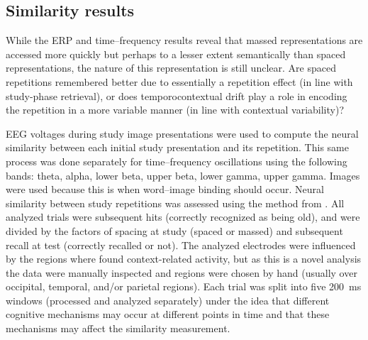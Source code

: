 
\subsection{Similarity results}

While the ERP and time--frequency results reveal that massed representations are accessed more quickly but perhaps to a lesser extent semantically than spaced representations, the nature of this representation is still unclear.  Are spaced repetitions remembered better due to essentially a repetition effect (in line with study-phase retrieval), or does temporocontextual drift play a role in encoding the repetition in a more variable manner (in line with contextual variability)?

EEG voltages during study image presentations were used to compute the neural similarity between each initial study presentation and its repetition.  This same process was done separately for time--frequency oscillations using the following bands: theta, alpha, lower beta, upper beta, lower gamma, upper gamma.  Images were used because this is when word--image binding
should occur.  Neural similarity between study repetitions was assessed using the method from .  All analyzed trials were subsequent hits (correctly recognized as being old), and were divided by the factors of spacing at study (spaced or massed) and subsequent recall at test (correctly recalled or not).
The analyzed electrodes were influenced by the regions where  found context-related activity, but as this is a novel analysis the data were manually inspected and regions were chosen by hand (usually over occipital, temporal, and/or parietal regions).  Each trial was split into five 200~ms windows (processed and analyzed separately) under the idea that different cognitive mechanisms may occur at different points in time and that these mechanisms may affect the similarity measurement.


